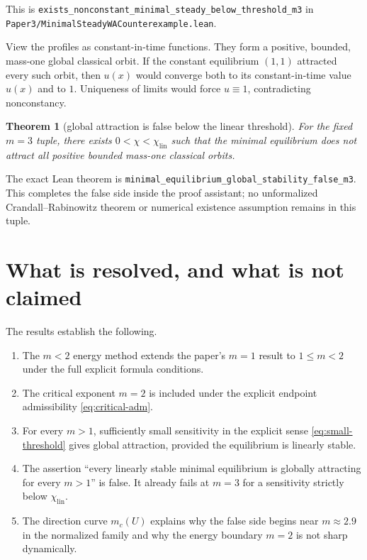 \documentclass[11pt]{article}
\newcommand{\code}[1]{\nolinkurl{#1}}
\newtheorem{theorem}{Theorem}
\begin{document}
\noindent This is
\code{exists_nonconstant_minimal_steady_below_threshold_m3} in
\code{Paper3/MinimalSteadyWACounterexample.lean}.

View the profiles as constant-in-time functions.  They form a positive,
bounded, mass-one global classical orbit.  If the constant equilibrium
\((1,1)\) attracted every such orbit, then \(u(x)\) would converge both to
its constant-in-time value \(u(x)\) and to \(1\).  Uniqueness of limits would
force \(u\equiv1\), contradicting nonconstancy.

\begin{theorem}[global attraction is false below the linear threshold]
For the fixed \(m=3\) tuple, there exists
\(0<\chi<\chi_{\mathrm{lin}}\) such that the minimal equilibrium does not
attract all positive bounded mass-one classical orbits.
\end{theorem}

\noindent The exact Lean theorem is
\code{minimal_equilibrium_global_stability_false_m3}.  This completes the
false side inside the proof assistant; no unformalized
Crandall--Rabinowitz theorem or numerical existence assumption remains in
this tuple.

\section{What is resolved, and what is not claimed}

The results establish the following.
\begin{enumerate}[leftmargin=2em]
\item The \(m<2\) energy method extends the paper's \(m=1\) result to
  \(1\le m<2\) under the full explicit formula conditions.
\item The critical exponent \(m=2\) is included under the explicit endpoint
  admissibility \eqref{eq:critical-adm}.
\item For every \(m>1\), sufficiently small sensitivity in the explicit
  sense \eqref{eq:small-threshold} gives global attraction, provided the
  equilibrium is linearly stable.
\item The assertion ``every linearly stable minimal equilibrium is globally
  attracting for every \(m>1\)'' is false.  It already fails at \(m=3\) for
  a sensitivity strictly below \(\chi_{\mathrm{lin}}\).
\item The direction curve \(m_c(U)\) explains why the false side begins near
  \(m\approx2.9\) in the normalized family and why the energy boundary
  \(m=2\) is not sharp dynamically.
\end{enumerate}
\end{document}
